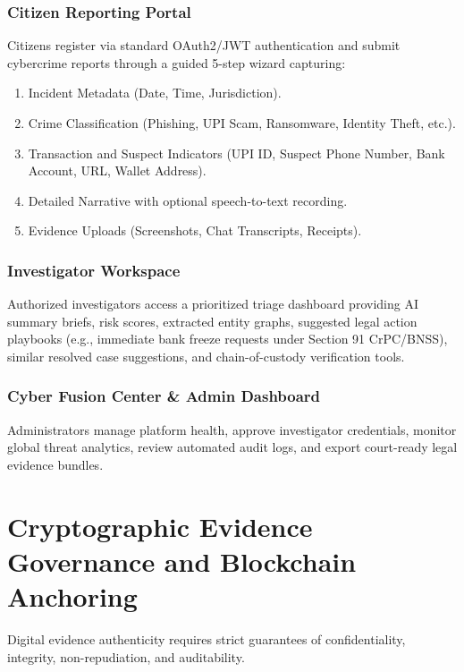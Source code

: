 \documentclass[conference]{IEEEtran}
\begin{document}
\subsubsection{Citizen Reporting Portal} Citizens register via standard OAuth2/JWT authentication and submit cybercrime reports through a guided 5-step wizard capturing:
\begin{enumerate}
    \item Incident Metadata (Date, Time, Jurisdiction).
    \item Crime Classification (Phishing, UPI Scam, Ransomware, Identity Theft, etc.).
    \item Transaction and Suspect Indicators (UPI ID, Suspect Phone Number, Bank Account, URL, Wallet Address).
    \item Detailed Narrative with optional speech-to-text recording.
    \item Evidence Uploads (Screenshots, Chat Transcripts, Receipts).
\end{enumerate}

\subsubsection{Investigator Workspace} Authorized investigators access a prioritized triage dashboard providing AI summary briefs, risk scores, extracted entity graphs, suggested legal action playbooks (e.g., immediate bank freeze requests under Section 91 CrPC/BNSS), similar resolved case suggestions, and chain-of-custody verification tools.

\subsubsection{Cyber Fusion Center \& Admin Dashboard} Administrators manage platform health, approve investigator credentials, monitor global threat analytics, review automated audit logs, and export court-ready legal evidence bundles.

\section{Cryptographic Evidence Governance and Blockchain Anchoring}
Digital evidence authenticity requires strict guarantees of confidentiality, integrity, non-repudiation, and auditability.
\end{document}
